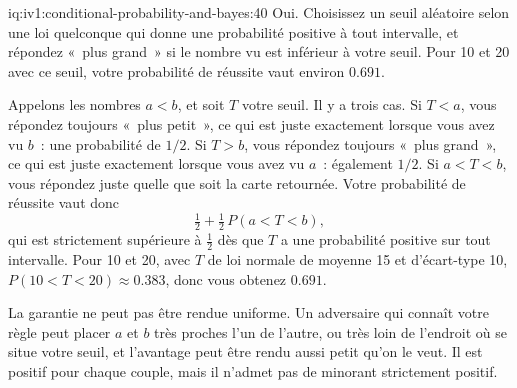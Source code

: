 \begin{solution}{iq:iv1:conditional-probability-and-bayes:40}
Oui. Choisissez un seuil aléatoire selon une loi quelconque qui donne une probabilité positive à tout intervalle, et répondez «~plus grand~» si le nombre vu est inférieur à votre seuil. Pour 10 et 20 avec ce seuil, votre probabilité de réussite vaut environ $0.691$.

Appelons les nombres $a < b$, et soit $T$ votre seuil. Il y a trois cas. Si $T < a$, vous répondez toujours «~plus petit~», ce qui est juste exactement lorsque vous avez vu $b$~: une probabilité de $1/2$. Si $T > b$, vous répondez toujours «~plus grand~», ce qui est juste exactement lorsque vous avez vu $a$~: également $1/2$. Si $a < T < b$, vous répondez juste quelle que soit la carte retournée. Votre probabilité de réussite vaut donc
\[
\tfrac12 + \tfrac12\, P(a < T < b),
\]
qui est strictement supérieure à $\tfrac12$ dès que $T$ a une probabilité positive sur tout intervalle. Pour 10 et 20, avec $T$ de loi normale de moyenne 15 et d'écart-type 10, $P(10 < T < 20) \approx 0.383$, donc vous obtenez $0.691$.

La garantie ne peut pas être rendue uniforme. Un adversaire qui connaît votre règle peut placer $a$ et $b$ très proches l'un de l'autre, ou très loin de l'endroit où se situe votre seuil, et l'avantage peut être rendu aussi petit qu'on le veut. Il est positif pour chaque couple, mais il n'admet pas de minorant strictement positif.

\end{solution}
